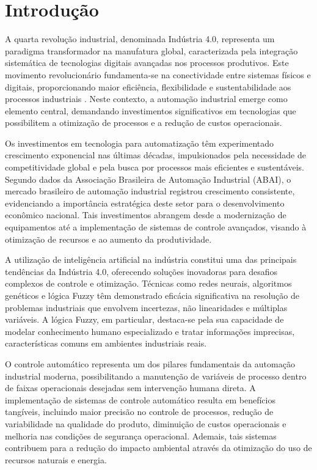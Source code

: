\chapter{Introdução}
\label{chap:intro}
\graphicspath{{./Cap1_introducao/Figures/}}

A quarta revolução industrial, denominada Indústria 4.0, representa um paradigma transformador na manufatura global, caracterizada pela integração sistemática de tecnologias digitais avançadas nos processos produtivos. Este movimento revolucionário fundamenta-se na conectividade entre sistemas físicos e digitais, proporcionando maior eficiência, flexibilidade e sustentabilidade aos processos industriais \cite{Schwab2016}. Neste contexto, a automação industrial emerge como elemento central, demandando investimentos significativos em tecnologias que possibilitem a otimização de processos e a redução de custos operacionais.

Os investimentos em tecnologia para automatização têm experimentado crescimento exponencial nas últimas décadas, impulsionados pela necessidade de competitividade global e pela busca por processos mais eficientes e sustentáveis. Segundo dados da Associação Brasileira de Automação Industrial (ABAI), o mercado brasileiro de automação industrial registrou crescimento consistente, evidenciando a importância estratégica deste setor para o desenvolvimento econômico nacional. Tais investimentos abrangem desde a modernização de equipamentos até a implementação de sistemas de controle avançados, visando à otimização de recursos e ao aumento da produtividade.

A utilização de inteligência artificial na indústria constitui uma das principais tendências da Indústria 4.0, oferecendo soluções inovadoras para desafios complexos de controle e otimização. Técnicas como redes neurais, algoritmos genéticos e lógica Fuzzy têm demonstrado eficácia significativa na resolução de problemas industriais que envolvem incertezas, não linearidades e múltiplas variáveis. A lógica Fuzzy, em particular, destaca-se pela sua capacidade de modelar conhecimento humano especializado e tratar informações imprecisas, características comuns em ambientes industriais reais.

O controle automático representa um dos pilares fundamentais da automação industrial moderna, possibilitando a manutenção de variáveis de processo dentro de faixas operacionais desejadas sem intervenção humana direta. A implementação de sistemas de controle automático resulta em benefícios tangíveis, incluindo maior precisão no controle de processos, redução de variabilidade na qualidade do produto, diminuição de custos operacionais e melhoria nas condições de segurança operacional. Ademais, tais sistemas contribuem para a redução do impacto ambiental através da otimização do uso de recursos naturais e energia.


